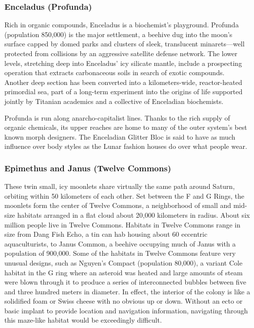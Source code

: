 \subsubsection{Enceladus (Profunda)}
\label{sec:enceladus-profunda} 

Rich in organic compounds, Enceladus is a biochemist’s playground. Profunda (population 850,000) is the major settlement, a beehive dug into the moon’s surface capped by domed parks and clusters of sleek, translucent minarets—well protected from collisions by an aggressive satellite defense network. The lower levels, stretching deep into Enceladus’ icy silicate mantle, include a prospecting operation that extracts carbonaceous soils in search of exotic compounds. Another deep section has been converted into a kilometers-wide, reactor-heated primordial sea, part of a long-term experiment into the origins of life supported jointly by Titanian academics and a collective of Enceladian biochemists. 

Profunda is run along anarcho-capitalist lines. Thanks to the rich supply of organic chemicals, its upper reaches are home to many of the outer system’s best known morph designers. The Enceladian Glitter Bloc is said to have as much influence over body styles as the Lunar fashion houses do over what people wear. 

\subsubsection{Epimethus and Janus (Twelve Commons)}
\label{sec:epim-janus-twelve} 

These twin small, icy moonlets share virtually the same path around Saturn, orbiting within 50 kilometers of each other. Set between the F and G Rings, the moonlets form the center of Twelve Commons, a neighborhood of small and mid-size habitats arranged in a flat cloud about 20,000 kilometers in radius. About six million people live in Twelve Commons. Habitats in Twelve Commons range in size from Dang Fish Echo, a tin can hab housing about 60 eccentric aquaculturists, to Janus Common, a beehive occupying much of Janus with a population of 900,000. Some of the habitats in Twelve Commons feature very unusual designs, such as Nguyen’s Compact (population 80,000), a variant Cole habitat in the G ring where an asteroid was heated and large amounts of steam were blown through it to produce a series of interconnected bubbles between five and three hundred meters in diameter. In effect, the interior of the colony is like a solidified foam or Swiss cheese with no obvious up or down. Without an ecto or basic implant to provide location and navigation information, navigating through this maze-like habitat would be exceedingly difficult. 

